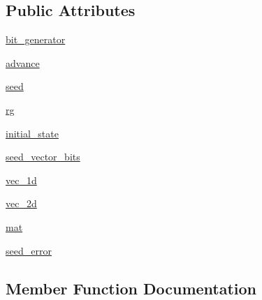\subsection*{Public Attributes}
\begin{DoxyCompactItemize}
\item 
\hyperlink{classnumpy_1_1random_1_1tests_1_1test__smoke_1_1RNG_afcae094cbc6e9a548d0eeff49d672d23}{bit\+\_\+generator}
\item 
\hyperlink{classnumpy_1_1random_1_1tests_1_1test__smoke_1_1RNG_a504676b86c8491d0752b4a54e2a71b69}{advance}
\item 
\hyperlink{classnumpy_1_1random_1_1tests_1_1test__smoke_1_1RNG_aca56a28347165f95ed79bc9f5741479a}{seed}
\item 
\hyperlink{classnumpy_1_1random_1_1tests_1_1test__smoke_1_1RNG_a604ef12a95d51a22537371eb9dbb9a70}{rg}
\item 
\hyperlink{classnumpy_1_1random_1_1tests_1_1test__smoke_1_1RNG_af1559a4336135207aea5d487aca068bd}{initial\+\_\+state}
\item 
\hyperlink{classnumpy_1_1random_1_1tests_1_1test__smoke_1_1RNG_a381170bfcca650a2c6dbb9cdc2fc508b}{seed\+\_\+vector\+\_\+bits}
\item 
\hyperlink{classnumpy_1_1random_1_1tests_1_1test__smoke_1_1RNG_af4d934f0966d146db0bf2ba2c7abec82}{vec\+\_\+1d}
\item 
\hyperlink{classnumpy_1_1random_1_1tests_1_1test__smoke_1_1RNG_a2e9ac8016fd57ea6fd138985cc7f23d2}{vec\+\_\+2d}
\item 
\hyperlink{classnumpy_1_1random_1_1tests_1_1test__smoke_1_1RNG_af05d118b625b73abad691a88e479eeaf}{mat}
\item 
\hyperlink{classnumpy_1_1random_1_1tests_1_1test__smoke_1_1RNG_aba65016157ae9ee27c47fc09496a5e03}{seed\+\_\+error}
\end{DoxyCompactItemize}


\subsection{Member Function Documentation}
\mbox{\label{classnumpy_1_1random_1_1tests_1_1test__smoke_1_1RNG_aade2896f4fcce94a3f675e3289a7b175}} 
